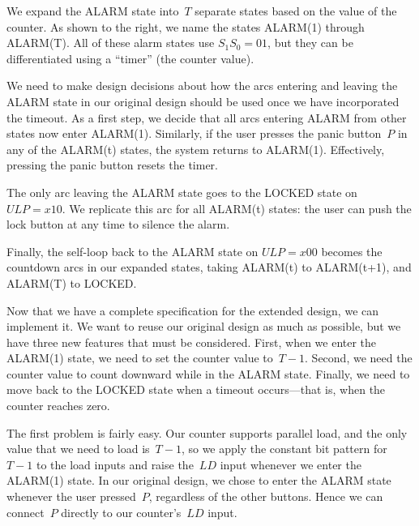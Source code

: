 \begin{minipage}{4.5in}
We expand the ALARM state into~$T$ separate states based on the value
of the counter.  As shown to the right, we name the states ALARM(1) 
through ALARM(T).  All of these alarm states use $S_1S_0=01$, but
they can be differentiated using a ``timer'' (the counter value).\mpline

We need to make design decisions about how the arcs entering and
leaving the ALARM state in our original design should be used once
we have incorporated the timeout.  As a first step, we decide that
all arcs entering ALARM from other states now enter ALARM(1).  
Similarly, if the user presses the panic button~$P$ in any of the
ALARM(t) states, the system returns to ALARM(1).  Effectively, 
pressing the panic button resets the timer.\mpline

The only arc leaving the ALARM state goes to the LOCKED state on 
$ULP=x10$.  We replicate this arc for all ALARM(t) states: the
user can push the lock button at any time to silence the alarm.\mpline

Finally, the self-loop back to the ALARM state on $ULP=x00$ becomes
the countdown arcs in our expanded states, taking ALARM(t) to ALARM(t+1),
and ALARM(T) to LOCKED.\mpline

Now that we have a complete specification for the extended design, we
can implement it.  We want to reuse our original design as much as possible,
but we have three new features that must be considered.  First, when
we enter the ALARM(1) state, we need to set the counter value to~$T-1$.
Second, we need the counter value to count downward while in the ALARM
state.  Finally, we need to move back to the LOCKED state when a timeout
occurs---that is, when the counter reaches zero.
\end{minipage}\hspace{0.25in}%
\begin{minipage}{1.75in}
\end{minipage}

The first problem is fairly easy.  Our counter supports parallel load,
and the only value that we need to load is~$T-1$, so we apply the constant
bit pattern for~$T-1$ to the load inputs and raise the~$LD$ input whenever
we enter the ALARM(1) state.  In our original design, we chose to enter
the ALARM state whenever the user pressed~$P$, regardless of the other
buttons.  Hence we can connect~$P$ directly to our counter's~$LD$ input.

